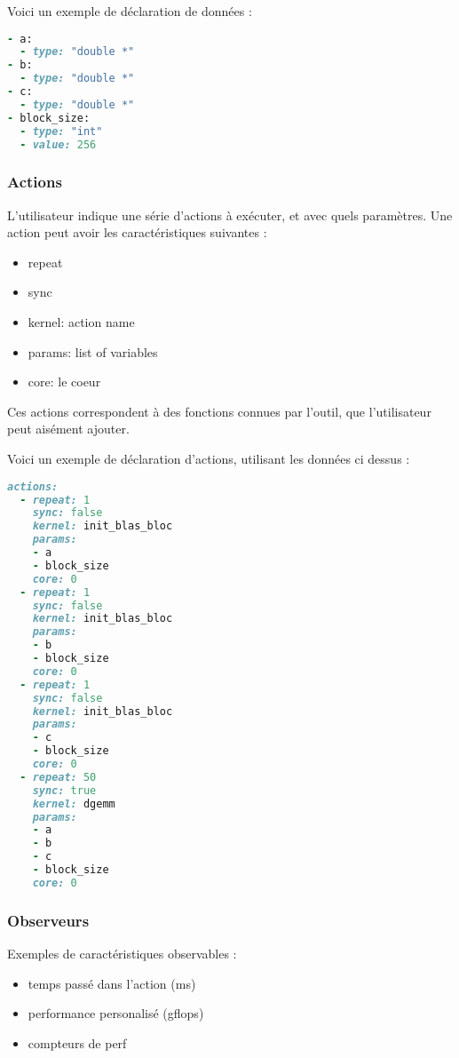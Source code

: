 Voici un exemple de déclaration de données :
\begin{lstlisting}[language=Ruby]
- a:
  - type: "double *"
- b:
  - type: "double *"
- c:
  - type: "double *"
- block_size:
  - type: "int"
  - value: 256
\end{lstlisting}

\subsubsection{Actions}

L'utilisateur indique une série d'actions à exécuter, et avec quels paramètres.
Une action peut avoir les caractéristiques suivantes :
\begin{itemize}
  \item repeat
  \item sync
  \item kernel: action name
  \item params: list of variables
  \item core: le coeur
\end{itemize}

Ces actions correspondent à des fonctions connues par l'outil, que l'utilisateur peut aisément ajouter.

Voici un exemple de déclaration d'actions, utilisant les données ci dessus :
\begin{lstlisting}[language=Ruby]
  actions: 
  - repeat: 1
    sync: false
    kernel: init_blas_bloc
    params: 
    - a
    - block_size
    core: 0
  - repeat: 1
    sync: false
    kernel: init_blas_bloc
    params: 
    - b
    - block_size
    core: 0
  - repeat: 1
    sync: false
    kernel: init_blas_bloc
    params: 
    - c
    - block_size
    core: 0
  - repeat: 50
    sync: true
    kernel: dgemm
    params: 
    - a
    - b
    - c
    - block_size
    core: 0
\end{lstlisting}

\subsubsection{Observeurs}

Exemples de caractéristiques observables :

\begin{itemize}
  \item temps passé dans l'action (ms)
  \item performance personalisé (gflops)
  \item compteurs de perf
\end{itemize}


